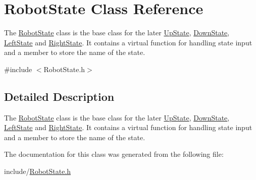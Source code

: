 \hypertarget{class_robot_state}{}\section{Robot\+State Class Reference}
\label{class_robot_state}


The \mbox{\hyperlink{class_robot_state}{Robot\+State}} class is the base class for the later \mbox{\hyperlink{class_up_state}{Up\+State}}, \mbox{\hyperlink{class_down_state}{Down\+State}}, \mbox{\hyperlink{class_left_state}{Left\+State}} and \mbox{\hyperlink{class_right_state}{Right\+State}}. It contains a virtual function for handling state input and a member to store the name of the state.  




{\ttfamily \#include $<$Robot\+State.\+h$>$}



\subsection{Detailed Description}
The \mbox{\hyperlink{class_robot_state}{Robot\+State}} class is the base class for the later \mbox{\hyperlink{class_up_state}{Up\+State}}, \mbox{\hyperlink{class_down_state}{Down\+State}}, \mbox{\hyperlink{class_left_state}{Left\+State}} and \mbox{\hyperlink{class_right_state}{Right\+State}}. It contains a virtual function for handling state input and a member to store the name of the state. 

The documentation for this class was generated from the following file\+:\begin{DoxyCompactItemize}
\item 
include/\mbox{\hyperlink{_robot_state_8h}{Robot\+State.\+h}}\end{DoxyCompactItemize}

